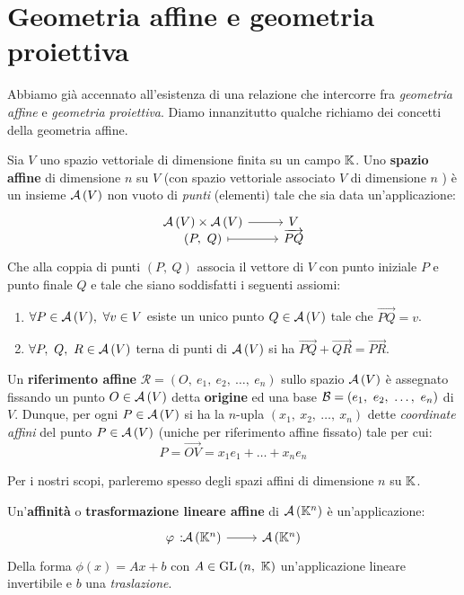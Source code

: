 \section{Geometria affine e geometria proiettiva}
Abbiamo già accennato all'esistenza di una relazione che intercorre fra \textit{geometria affine} e \textit{geometria proiettiva}. Diamo innanzitutto qualche richiamo dei concetti della geometria affine.
\begin{define}
	Sia $V$ uno spazio vettoriale di dimensione finita su un campo $\mathbb{K}$. Uno \textbf{spazio affine} di dimensione $n$ su $V$ (con spazio vettoriale associato $V$ di dimensione $n$ ) è un insieme ${\mathcal{A}\left(V\right)}$ non vuoto di \textit{punti} (elementi) tale che sia data un'applicazione:
	\begin{equation*}
		\funztot{\ }{\aff{V}\times\aff{V} }{V}{\left(P,\ Q\right)}{\overrightarrow{PQ}}
	\end{equation*}
	Che alla coppia di punti $\left(P,\ Q\right)$ associa il vettore di $V$ con punto iniziale $P$ e punto finale $Q$ e tale che siano
	soddisfatti i seguenti assiomi:
	\begin{enumerate}
		\item $\forall P\in{\ensuremath{\mathcal{A}\left(V\right)}},\ \forall v\in V$ esiste un unico punto $Q\in{\ensuremath{\mathcal{A}\left(V\right)}}$ tale che $\overrightarrow{PQ}=v$.
		\item $\forall P,\ Q,\ R\in{\ensuremath{\mathcal{A}\left(V\right)}}$ terna di punti di ${\mathcal{A}\left(V\right)}$ si ha $\overrightarrow{PQ}+\overrightarrow{QR}=\overrightarrow{PR}$.
	\end{enumerate}
\end{define}
\begin{define}
	Un \textbf{riferimento affine} $\mathcal{R} = (O,\  e_1,\  e_2,\ \ldots,\  e_n)$ sullo spazio ${\mathcal{A}\left(V\right)}$ è assegnato fissando un punto $O\in {\ensuremath{\mathcal{A}\left(V\right)}}$ detta \textbf{origine} ed una base $\mathcal{B} = (e_1,\  e_2,\ \ldots,\  e_n)$ di $V$. Dunque, per ogni $P\in {\ensuremath{\mathcal{A}\left(V\right)}}$ si ha la $n$-upla $(x_1,\  x_2,\ \ldots,\  x_n)$ dette \textit{coordinate affini} del punto $P\in{\ensuremath{\mathcal{A}\left(V\right)}}$ (uniche per riferimento affine fissato) tale per cui:
	\begin{equation}
		P=\overrightarrow{OV}=x_1e_1+\ldots+x_ne_n
	\end{equation}
\end{define}
Per i nostri scopi, parleremo spesso degli spazi affini di dimensione $n$ su $\mathbb{K}$.
\begin{define}
	Un'\textbf{affinità} o \textbf{trasformazione lineare affine} di ${\mathcal{A}\left(\mathbb{K}^n\right)}$ è un'applicazione:
	\begin{equation}
		\funz{\phi}{\aff{\kamp^n}}{\aff{\kamp^n}}
	\end{equation}
Della forma $\phi\left(x\right)=Ax+b$ con $A\in\operatorname{GL}\left(n,\ \mathbb{K}\right)$ un'applicazione lineare invertibile e $b$ una \textit{traslazione}.
\end{define}

